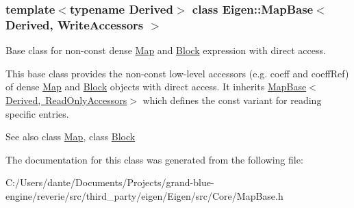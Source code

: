 \subsubsection*{template$<$typename Derived$>$\newline
class Eigen\+::\+Map\+Base$<$ Derived, Write\+Accessors $>$}

Base class for non-\/const dense \mbox{\hyperlink{class_eigen_1_1_map}{Map}} and \mbox{\hyperlink{class_eigen_1_1_block}{Block}} expression with direct access. 

This base class provides the non-\/const low-\/level accessors (e.\+g. coeff and coeff\+Ref) of dense \mbox{\hyperlink{class_eigen_1_1_map}{Map}} and \mbox{\hyperlink{class_eigen_1_1_block}{Block}} objects with direct access. It inherits \mbox{\hyperlink{class_eigen_1_1_map_base_3_01_derived_00_01_read_only_accessors_01_4}{Map\+Base$<$\+Derived, Read\+Only\+Accessors$>$}} which defines the const variant for reading specific entries.

\begin{DoxySeeAlso}{See also}
class \mbox{\hyperlink{class_eigen_1_1_map}{Map}}, class \mbox{\hyperlink{class_eigen_1_1_block}{Block}} 
\end{DoxySeeAlso}


The documentation for this class was generated from the following file\+:\begin{DoxyCompactItemize}
\item 
C\+:/\+Users/dante/\+Documents/\+Projects/grand-\/blue-\/engine/reverie/src/third\+\_\+party/eigen/\+Eigen/src/\+Core/Map\+Base.\+h\end{DoxyCompactItemize}

